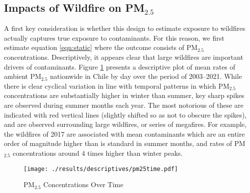 \documentclass[11pt]{article}
\begin{document}
\begin{spacing}{1.5}
\subsection{Impacts of Wildfire on PM$_{2.5}$}
\label{sscn:results_pm25}
A first key consideration is whether this design to estimate exposure to wildfires actually captures true exposure to contaminants.  For this reason, we first estimate equation \ref{eqn:static} where the outcome consists of PM$_{2.5}$ concentrations.  Descriptively, it appears clear that large wildfires are important drivers of contaminants.  Figure \ref{fig:PM25} presents a descriptive plot of mean rates of ambient PM$_{2.5}$ nationwide in Chile by day over the period of 2003--2021.  While there is clear cyclical variation in line with temporal patterns in which PM$_{2.5}$ concentrations are substantially higher in winter than summer, key sharp spikes are observed during summer months each year.  The most notorious of these are indicated with red vertical lines (slightly shifted so as not to obscure the spikes), and are observed surrounding large wildfires, or series of megafires.  For example, the wildfires of 2017 are associated with mean contaminants which are an entire order of magnitude higher than is standard in summer months, and rates of PM$_{2.5}$ concentrations around 4 times higher than winter peaks.

\begin{figure}[ht!]
    \centering
    \texttt{[image: ./results/descriptives/pm25time.pdf]}
    \caption{PM$_{2.5}$ Concentrations Over Time}
    \label{fig:PM25}
\end{figure}





\end{spacing}
\end{document}

